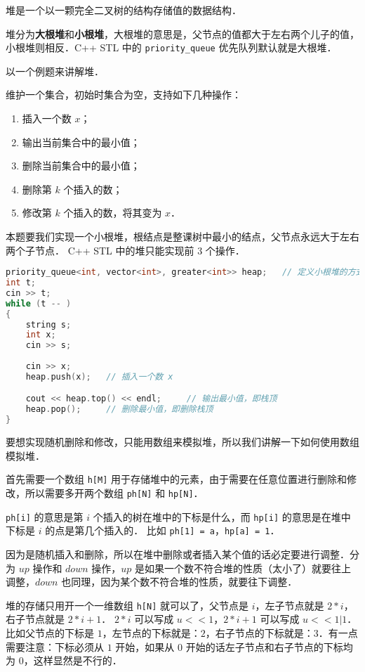 
堆是一个以一颗完全二叉树的结构存储值的数据结构．

堆分为\textbf{大根堆}和\textbf{小根堆}，大根堆的意思是，父节点的值都大于左右两个儿子的值，小根堆则相反．C++ STL 中的 \verb|priority_queue| 优先队列默认就是大根堆．

以一个例题来讲解堆．

维护一个集合，初始时集合为空，支持如下几种操作：
\begin{enumerate}
\item 插入一个数 $x$；
\item 输出当前集合中的最小值；
\item 删除当前集合中的最小值；
\item 删除第 $k$ 个插入的数；
\item 修改第 $k$ 个插入的数，将其变为 $x$．
\end{enumerate}

本题要我们实现一个小根堆，根结点是整课树中最小的结点，父节点永远大于左右两个子节点．
C++ STL 中的堆只能实现前 $3$ 个操作．
\begin{lstlisting}[language=cpp]
priority_queue<int, vector<int>, greater<int>> heap;   // 定义小根堆的方式
int t;
cin >> t;
while (t -- )
{
    string s;
    int x;
    cin >> s;
            
    cin >> x;
    heap.push(x);   // 插入一个数 x

    cout << heap.top() << endl;     // 输出最小值，即栈顶
    heap.pop();     // 删除最小值，即删除栈顶
}
\end{lstlisting}

要想实现随机删除和修改，只能用数组来模拟堆，所以我们讲解一下如何使用数组模拟堆．

首先需要一个数组 \verb|h[M]| 用于存储堆中的元素，由于需要在任意位置进行删除和修改，所以需要多开两个数组 \verb|ph[N]| 和 \verb|hp[N]|．

\verb|ph[i]| 的意思是第 $i$ 个插入的树在堆中的下标是什么，而 \verb|hp[i]| 的意思是在堆中下标是 $i$ 的点是第几个插入的．
比如 \verb|ph[1] = a|，\verb|hp[a] = 1|．

因为是随机插入和删除，所以在堆中删除或者插入某个值的话必定要进行调整．分为 $up$ 操作和 $down$ 操作，$up$ 是如果一个数不符合堆的性质（太小了）就要往上调整，$down$ 也同理，因为某个数不符合堆的性质，就要往下调整．

堆的存储只用开一个一维数组 \verb|h[N]| 就可以了，父节点是 $i$，左子节点就是 $2 * i$，右子节点就是 $2 * i + 1$．
$2 * i$ 可以写成 $u << 1$，$2 * i + 1$ 可以写成 $u << 1 | 1$．比如父节点的下标是 $1$，左节点的下标就是：$2$，右子节点的下标就是：$3$．有一点需要注意：下标必须从 $1$ 开始，如果从 $0$ 开始的话左子节点和右子节点的下标均为 $0$，这样显然是不行的．







